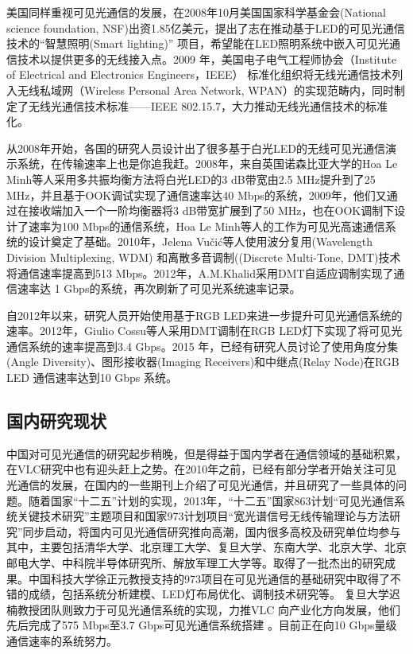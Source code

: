 美国同样重视可见光通信的发展，在2008年10月美国国家科学基金会(National science foundation, NSF)出资1.85亿美元，提出了志在推动基于LED的可见光通信技术的“智慧照明(Smart lighting)” 项目，希望能在LED照明系统中嵌入可见光通信技术以提供更多的无线接入点。2009 年，美国电子电气工程师协会（Institute of Electrical and Electronics Engineers，IEEE）
标准化组织将无线光通信技术列入无线私域网（Wireless Personal Area Network, WPAN）的实现范畴内，同时制定了无线光通信技术标准——IEEE 802.15.7，大力推动无线光通信技术的标准化。

从2008年开始，各国的研究人员设计出了很多基于白光LED的无线可见光通信演示系统，在传输速率上也是你追我赶。2008年，来自英国诺森比亚大学的Hoa Le Minh等人采用多共振均衡方法将白光LED的3 dB带宽由2.5 MHz提升到了25 MHz，并且基于OOK调试实现了通信速率达40 Mbps的系统\cite{minh2008high}，2009年，他们又通过在接收端加入一个一阶均衡器将3 dB带宽扩展到了50 MHz，也在OOK调制下设计了速率为100 Mbps的通信系统\cite{le2009100}，Hoa Le Minh等人的工作为可见光高速通信系统的设计奠定了基础。2010年，Jelena Vu{\v{c}}i{\'c}等人使用波分复用(Wavelength Division Multiplexing, WDM) 和离散多音调制((Discrete Multi-Tone, DMT)技术将通信速率提高到513 Mbps\cite{vuvcic2010513}。2012年，A.M.Khalid采用DMT自适应调制实现了通信速率达 1 Gbps的系统，再次刷新了可见光系统速率记录。

自2012年以来，研究人员开始使用基于RGB LED来进一步提升可见光通信系统的速率。2012年，Giulio Cossu等人采用DMT调制在RGB LED灯下实现了将可见光通信系统的速率提高到3.4 Gbps\cite{cossu20123}。2015 年，已经有研究人员讨论了使用角度分集(Angle Diversity)、图形接收器(Imaging Receivers)和中继点(Relay Node)在RGB LED 通信速率达到10 Gbps 系统\cite{hussein201510}。



\subsection{国内研究现状}
中国对可见光通信的研究起步稍晚，但是得益于国内学者在通信领域的基础积累，在VLC研究中也有迎头赶上之势。在2010年之前，已经有部分学者开始关注可见光通信的发展，在国内的一些期刊上介绍了可见光通信，并且研究了一些具体的问题\cite{丁德强2006可见光通信及其关键技术研究,于志刚2008白光,张立2010室内}。随着国家“十二五”计划的实现，2013年，“十二五”国家863计划“可见光通信系统关键技术研究”主题项目和国家973计划项目“宽光谱信号无线传输理论与方法研究”同步启动，将国内可见光通信研究推向高潮，国内很多高校及研究单位均参与其中，主要包括清华大学、北京理工大学、复旦大学、东南大学、北京大学、北京邮电大学、中科院半导体研究所、解放军理工大学等。取得了一批杰出的研究成果。中国科技大学徐正元教授支持的973项目在可见光通信的基础研究中取得了不错的成绩，包括系统分析建模、LED灯布局优化、调制技术研究等\cite{ma2012effects,zhang2012capacity,ma2012distributions}。 复旦大学迟楠教授团队则致力于可见光通信系统的实现，力推VLC 向产业化方向发展，他们先后完成了575 Mbps至3.7 Gbps可见光通信系统搭建
\cite{wang2013demonstration,wang2013875,chi2014ultra}。目前正在向10 Gbps量级通信速率的系统努力\cite{wang2014integrated}。

